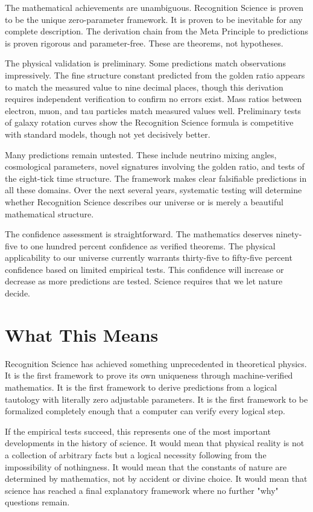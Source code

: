 \documentclass[12pt]{article}
\begin{document}
The mathematical achievements are unambiguous. Recognition Science is proven to be the unique zero-parameter framework. It is proven to be inevitable for any complete description. The derivation chain from the Meta Principle to predictions is proven rigorous and parameter-free. These are theorems, not hypotheses.

The physical validation is preliminary. Some predictions match observations impressively. The fine structure constant predicted from the golden ratio appears to match the measured value to nine decimal places, though this derivation requires independent verification to confirm no errors exist. Mass ratios between electron, muon, and tau particles match measured values well. Preliminary tests of galaxy rotation curves show the Recognition Science formula is competitive with standard models, though not yet decisively better.

Many predictions remain untested. These include neutrino mixing angles, cosmological parameters, novel signatures involving the golden ratio, and tests of the eight-tick time structure. The framework makes clear falsifiable predictions in all these domains. Over the next several years, systematic testing will determine whether Recognition Science describes our universe or is merely a beautiful mathematical structure.

The confidence assessment is straightforward. The mathematics deserves ninety-five to one hundred percent confidence as verified theorems. The physical applicability to our universe currently warrants thirty-five to fifty-five percent confidence based on limited empirical tests. This confidence will increase or decrease as more predictions are tested. Science requires that we let nature decide.

\section{What This Means}

Recognition Science has achieved something unprecedented in theoretical physics. It is the first framework to prove its own uniqueness through machine-verified mathematics. It is the first framework to derive predictions from a logical tautology with literally zero adjustable parameters. It is the first framework to be formalized completely enough that a computer can verify every logical step.

If the empirical tests succeed, this represents one of the most important developments in the history of science. It would mean that physical reality is not a collection of arbitrary facts but a logical necessity following from the impossibility of nothingness. It would mean that the constants of nature are determined by mathematics, not by accident or divine choice. It would mean that science has reached a final explanatory framework where no further "why" questions remain.
\end{document}
